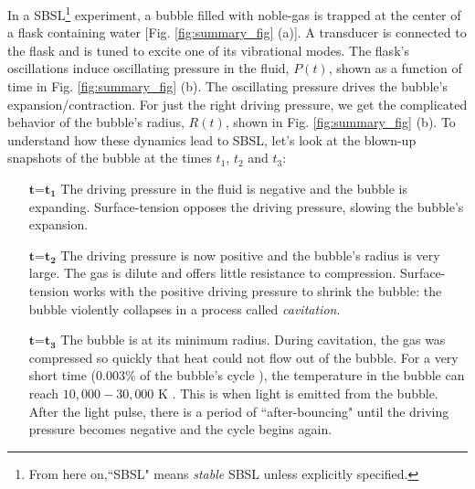 \documentclass[11pt,prb,aps,nofootinbib,superscriptaddress,floatfix]{revtex4-2}
\begin{document}
In a SBSL\footnote{From here on,``SBSL" means \emph{stable} SBSL unless explicitly specified.} experiment, a bubble filled with noble-gas is trapped at the center of a flask containing water [Fig. \ref{fig:summary_fig} (a)]. A transducer is connected to the flask and is tuned to excite one of its vibrational modes. The flask's oscillations induce oscillating pressure in the fluid, $P(t)$, shown as a function of time in Fig. \ref{fig:summary_fig} (b). The oscillating pressure drives the bubble's expansion/contraction. For just the right driving pressure, we get the complicated behavior of the bubble's radius, $R(t)$, shown in Fig. \ref{fig:summary_fig} (b). To understand how these dynamics lead to SBSL, let's look at the blown-up snapshots of the bubble at the times $t_1$, $t_2$ and $t_3$:
\begin{itemize}
    \item [$\bm{t}$=$\bm{t_1}$] The driving pressure in the fluid is negative and the bubble is expanding. Surface-tension opposes the driving pressure, slowing the bubble's expansion.
    \item [$\bm{t}$=$\bm{t_2}$] The driving pressure is now positive and the bubble's radius is very large. The gas is dilute and offers little resistance to compression. Surface-tension works with the positive driving pressure to shrink the bubble: the bubble violently collapses in a process called \emph{cavitation}. 
    \item [$\bm{t}$=$\bm{t_3}$] The bubble is at its minimum radius. During cavitation, the gas was compressed so quickly that heat could not flow out of the bubble. For a very short time ($ 0.003\% $ of the bubble's cycle \cite{suslick2008inside}), the temperature in the bubble can reach $10,000-30,000$ K \cite{an2006mechanism,hilgenfeldt1999simple,an2008spectral,an2009diagnosing}. This is when light is emitted from the bubble. After the light pulse, there is a period of ``after-bouncing" until the driving pressure becomes negative and the cycle begins again.
\end{itemize}
\end{document}
